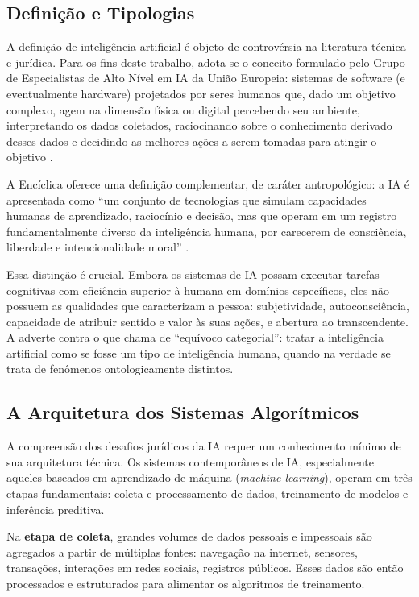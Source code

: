 \subsection{Definição e Tipologias}
\label{subsec:definicao-ia}

A definição de inteligência artificial é objeto de controvérsia na literatura técnica e jurídica. Para os fins deste trabalho, adota-se o conceito formulado pelo Grupo de Especialistas de Alto Nível em IA da União Europeia: sistemas de software (e eventualmente hardware) projetados por seres humanos que, dado um objetivo complexo, agem na dimensão física ou digital percebendo seu ambiente, interpretando os dados coletados, raciocinando sobre o conhecimento derivado desses dados e decidindo as melhores ações a serem tomadas para atingir o objetivo \cite{HighLevelExpertGroup2019EA}.

A Encíclica \MH{} oferece uma definição complementar, de caráter antropológico: a IA é apresentada como ``um conjunto de tecnologias que simulam capacidades humanas de aprendizado, raciocínio e decisão, mas que operam em um registro fundamentalmente diverso da inteligência humana, por carecerem de consciência, liberdade e intencionalidade moral'' \cite{LeaoXIV2026MH}.

Essa distinção é crucial. Embora os sistemas de IA possam executar tarefas cognitivas com eficiência superior à humana em domínios específicos, eles não possuem as qualidades que caracterizam a pessoa: subjetividade, autoconsciência, capacidade de atribuir sentido e valor às suas ações, e abertura ao transcendente. A \MH{} adverte contra o que chama de ``equívoco categorial'': tratar a inteligência artificial como se fosse um tipo de inteligência humana, quando na verdade se trata de fenômenos ontologicamente distintos.

\subsection{A Arquitetura dos Sistemas Algorítmicos}
\label{subsec:arquitetura-algoritmica}

A compreensão dos desafios jurídicos da IA requer um conhecimento mínimo de sua arquitetura técnica. Os sistemas contemporâneos de IA, especialmente aqueles baseados em aprendizado de máquina (\textit{machine learning}), operam em três etapas fundamentais: coleta e processamento de dados, treinamento de modelos e inferência preditiva.

Na \textbf{etapa de coleta}, grandes volumes de dados pessoais e impessoais são agregados a partir de múltiplas fontes: navegação na internet, sensores, transações, interações em redes sociais, registros públicos. Esses dados são então processados e estruturados para alimentar os algoritmos de treinamento.

